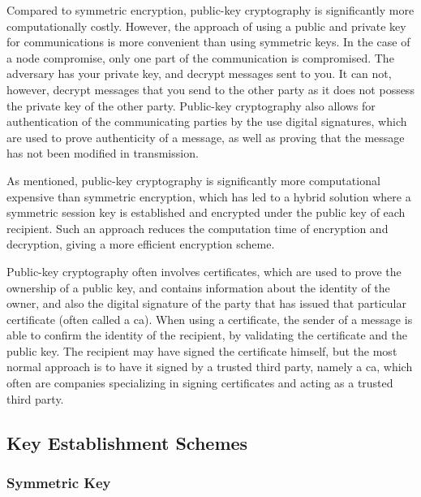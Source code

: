 Compared to symmetric encryption, public-key cryptography is significantly more computationally costly. However, the approach of using a public and private key for communications is more convenient than using symmetric keys. In the case of a node compromise, only one part of the communication is compromised. The adversary has your private key, and decrypt messages sent to you. It can not, however, decrypt messages that you send to the other party as it does not possess the private key of the other party. Public-key cryptography also allows for authentication of the communicating parties by the use digital signatures, which are used to prove authenticity of a message, as well as proving that the message has not been modified in transmission.


As mentioned, public-key cryptography is significantly more computational expensive than symmetric encryption, which has led to a hybrid solution where a symmetric session key is established and encrypted under the public key of each recipient. Such an approach reduces the computation time of encryption and decryption, giving a more efficient encryption scheme.

Public-key cryptography often involves certificates, which are used to prove the ownership of a public key, and contains information about the identity of the owner, and also the digital signature of the party that has issued that particular certificate (often called a \gls{ca}). When using a certificate, the sender of a message is able to confirm the identity of the recipient, by validating the certificate and the public key. The recipient may have signed the certificate himself, but the most normal approach is to have it signed by a trusted third party, namely a \gls{ca}, which often are companies specializing in signing certificates and acting as a trusted third party.

\subsection{Key Establishment Schemes}


\subsubsection{Symmetric Key}

